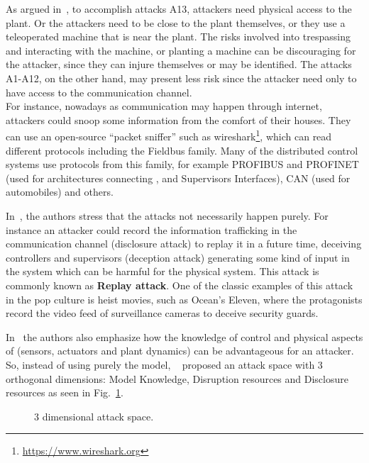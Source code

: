 \documentclass[../main.tex]{subfiles}
\begin{document}
As argued in~\cite{CardenasEtAl2008}, to accomplish attacks A13, attackers need physical access to the plant.
Or the attackers need to be close to the plant themselves, or they use a teleoperated machine that is near the plant.
The risks involved into trespassing and interacting with the machine, or planting a machine can be discouraging for the attacker, since they can injure themselves or may be identified.
The attacks A1-A12, on the other hand, may present less risk since the attacker need only to have access to the communication channel.
\\For instance, nowadays as communication may happen through internet, attackers could snoop some information from the comfort of their houses.
They can use an open-source ``packet sniffer'' such as wireshark\footnote{\url{https://www.wireshark.org}}, which can read different protocols including the Fieldbus family.
Many of the distributed control systems use protocols from this family, for example PROFIBUS and PROFINET (used for \scada{} architectures connecting \plcs{}, \HMIs{} and Supervisors Interfaces), CAN (used for automobiles) and others.

In~\cite{TeixeiraEtAl2015}, the authors stress that the attacks not necessarily happen purely.
For instance an attacker could record the information trafficking in the communication channel (disclosure attack) to replay it in a future time, deceiving controllers and supervisors (deception attack) generating some kind of input in the system which can be harmful for the physical system.
This attack is commonly known as \textbf{Replay attack}.
One of the classic examples of this attack in the pop culture is heist movies, such as Ocean's Eleven, where the protagonists record the video feed of surveillance cameras to deceive security guards.

In~\cite{TeixeiraEtAl2015} the authors also emphasize how the knowledge of control and physical aspects of \cps{} (sensors, actuators and plant dynamics) can be advantageous for an attacker.
So, instead of using purely the \DDD{} model, \citeauthor{TeixeiraEtAl2015}~\cite{TeixeiraEtAl2015} proposed an attack space with 3 orthogonal dimensions: Model Knowledge, Disruption resources and Disclosure resources as seen in Fig.~\ref{fig:3_dimensions_attack}.

\usetikzlibrary{3d}
\usetikzlibrary{perspective}
\begin{figure}[h]
  \centering
  \caption{3 dimensional attack space.}\label{fig:3_dimensions_attack}
\end{figure}
\end{document}
